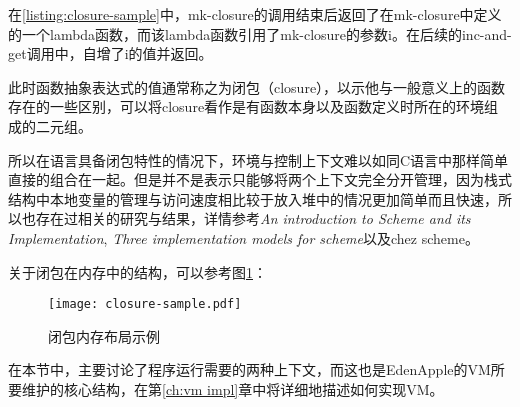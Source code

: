 在\ref{listing:closure-sample}中，mk-closure的调用结束后返回了在mk-closure中定义的一个lambda函数，而该lambda函数引用了mk-closure的参数i。在后续的inc-and-get调用中，自增了i的值并返回。

此时函数抽象表达式的值通常称之为闭包（closure），以示他与一般意义上的函数存在的一些区别，可以将closure看作是有函数本身以及函数定义时所在的环境组成的二元组。

所以在语言具备闭包特性的情况下，环境与控制上下文难以如同C语言中那样简单直接的组合在一起。但是并不是表示只能够将两个上下文完全分开管理，因为栈式结构中本地变量的管理与访问速度相比较于放入堆中的情况更加简单而且快速，所以也存在过相关的研究与结果，详情参考\textit{An introduction to Scheme and its Implementation\cite{wilson96intro}}, \textit{Three implementation models for scheme\cite{dybvig87timpl}}以及chez scheme。 

关于闭包在内存中的结构，可以参考图\ref{fig:closure-mem-layout}：

\begin{figure}
\centering
\texttt{[image: closure-sample.pdf]}
\caption{闭包内存布局示例}
\label{fig:closure-mem-layout}
\end{figure}

在本节中，主要讨论了程序运行需要的两种上下文，而这也是EdenApple的VM所要维护的核心结构，在第\ref{ch:vm impl}章中将详细地描述如何实现VM。